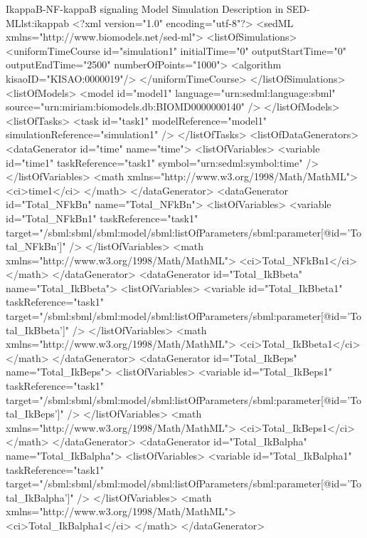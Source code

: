 \footnotesize
\begin{myXmlLst}{IkappaB-NF-kappaB signaling Model Simulation Description in SED-ML}{lst:ikappab}
<?xml version="1.0" encoding="utf-8"?>
<sedML xmlns="http://www.biomodels.net/sed-ml">
  <listOfSimulations>
    <uniformTimeCourse id="simulation1"
    initialTime="0" outputStartTime="0" outputEndTime="2500"
    numberOfPoints="1000">	
	  <algorithm kisaoID="KISAO:0000019"/>	
	</uniformTimeCourse>
  </listOfSimulations>
  <listOfModels>
    <model id="model1" language="urn:sedml:language:sbml" source="urn:miriam:biomodels.db:BIOMD0000000140" />
  </listOfModels>
  <listOfTasks>
    <task id="task1" modelReference="model1"
    simulationReference="simulation1" />
  </listOfTasks>
  <listOfDataGenerators>
    <dataGenerator id="time" name="time">
      <listOfVariables>
        <variable id="time1" taskReference="task1" symbol="urn:sedml:symbol:time" />
      </listOfVariables>
      <math xmlns="http://www.w3.org/1998/Math/MathML">
        <ci>time1</ci>
      </math>
    </dataGenerator>
    <dataGenerator id="Total_NFkBn" name="Total_NFkBn">
      <listOfVariables>
        <variable id="Total_NFkBn1" taskReference="task1"
        target="/sbml:sbml/sbml:model/sbml:listOfParameters/sbml:parameter[@id='Total_NFkBn']" />
      </listOfVariables>
      <math xmlns="http://www.w3.org/1998/Math/MathML">
        <ci>Total_NFkBn1</ci>
      </math>
    </dataGenerator>
    <dataGenerator id="Total_IkBbeta" name="Total_IkBbeta">
      <listOfVariables>
        <variable id="Total_IkBbeta1" taskReference="task1"
        target="/sbml:sbml/sbml:model/sbml:listOfParameters/sbml:parameter[@id='Total_IkBbeta']" />
      </listOfVariables>
      <math xmlns="http://www.w3.org/1998/Math/MathML">
        <ci>Total_IkBbeta1</ci>
      </math>
    </dataGenerator>
    <dataGenerator id="Total_IkBeps" name="Total_IkBeps">
      <listOfVariables>
        <variable id="Total_IkBeps1" taskReference="task1"
        target="/sbml:sbml/sbml:model/sbml:listOfParameters/sbml:parameter[@id='Total_IkBeps']" />
      </listOfVariables>
      <math xmlns="http://www.w3.org/1998/Math/MathML">
        <ci>Total_IkBeps1</ci>
      </math>
    </dataGenerator>
    <dataGenerator id="Total_IkBalpha" name="Total_IkBalpha">
      <listOfVariables>
        <variable id="Total_IkBalpha1" taskReference="task1"
        target="/sbml:sbml/sbml:model/sbml:listOfParameters/sbml:parameter[@id='Total_IkBalpha']" />
      </listOfVariables>
      <math xmlns="http://www.w3.org/1998/Math/MathML">
        <ci>Total_IkBalpha1</ci>
      </math>
    </dataGenerator>

\end{myXmlLst}
